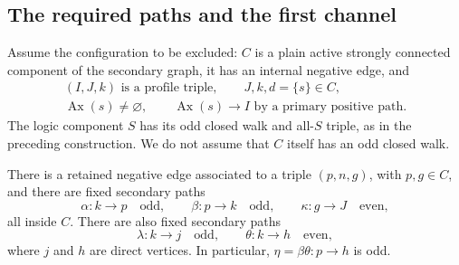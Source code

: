 \subsection{The required paths and the first channel}

Assume the configuration to be excluded: $C$ is a plain active strongly
connected component of the secondary graph, it has an internal negative
edge, and
\begin{equation}
\begin{gathered}
 (I,J,k)\text{ is a profile triple},\qquad J,k,d=\{s\}\in C,\\
 \operatorname{Ax}(s)\ne\varnothing,\qquad
 \operatorname{Ax}(s)\longrightarrow I
 \text{ by a primary positive path}.
\end{gathered}
\label{chan-configuration}
\end{equation}
The logic component $S$ has its odd closed walk and all-$S$ triple, as in
the preceding construction.  We do not assume that $C$ itself has an odd
closed walk.

\begin{lemma}
\label{chan-paths}
There is a retained negative edge associated to a triple $(p,n,g)$, with
$p,g\in C$, and there are fixed secondary paths
\[
 \alpha:k\longrightarrow p\quad\text{odd},\qquad
 \beta:p\longrightarrow k\quad\text{odd},\qquad
 \kappa:g\longrightarrow J\quad\text{even},
\]
all inside $C$.  There are also fixed secondary paths
\[
 \lambda:k\longrightarrow j\quad\text{odd},\qquad
 \theta:k\longrightarrow h\quad\text{even},
\]
where $j$ and $h$ are direct vertices.  In particular,
$\eta=\beta\theta:p\longrightarrow h$ is odd.
\end{lemma}

